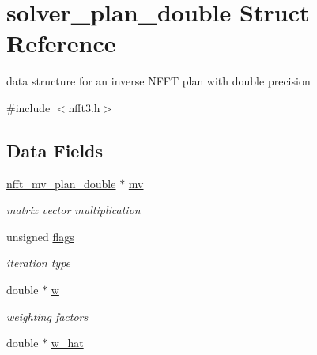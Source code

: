 \hypertarget{structsolver__plan__double}{\section{solver\-\_\-plan\-\_\-double Struct Reference}
\label{structsolver__plan__double}
}


data structure for an inverse N\-F\-F\-T plan with double precision  




{\ttfamily \#include $<$nfft3.\-h$>$}

\subsection*{Data Fields}
\begin{DoxyCompactItemize}
\item 
\hypertarget{structsolver__plan__double_a114ce0569fe40dbbf97d8f5fbe125404}{\hyperlink{structnfft__mv__plan__double}{nfft\-\_\-mv\-\_\-plan\-\_\-double} $\ast$ \hyperlink{structsolver__plan__double_a114ce0569fe40dbbf97d8f5fbe125404}{mv}}\label{structsolver__plan__double_a114ce0569fe40dbbf97d8f5fbe125404}

\begin{DoxyCompactList}\small\item\em matrix vector multiplication \end{DoxyCompactList}\item 
\hypertarget{structsolver__plan__double_ad4f6df9d890d106438ed0d3d725bf5b4}{unsigned \hyperlink{structsolver__plan__double_ad4f6df9d890d106438ed0d3d725bf5b4}{flags}}\label{structsolver__plan__double_ad4f6df9d890d106438ed0d3d725bf5b4}

\begin{DoxyCompactList}\small\item\em iteration type \end{DoxyCompactList}\item 
\hypertarget{structsolver__plan__double_adc2b7cea47756753ae9f8d5731f8d500}{double $\ast$ \hyperlink{structsolver__plan__double_adc2b7cea47756753ae9f8d5731f8d500}{w}}\label{structsolver__plan__double_adc2b7cea47756753ae9f8d5731f8d500}

\begin{DoxyCompactList}\small\item\em weighting factors \end{DoxyCompactList}\item 
\hypertarget{structsolver__plan__double_ab16ed4ac6cf04f57c4b1f194fbc09472}{double $\ast$ \hyperlink{structsolver__plan__double_ab16ed4ac6cf04f57c4b1f194fbc09472}{w\-\_\-hat}}\label{structsolver__plan__double_ab16ed4ac6cf04f57c4b1f194fbc09472}


\end{DoxyCompactItemize}
